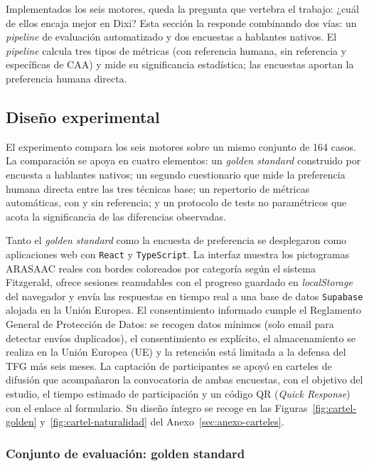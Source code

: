 Implementados los seis motores, queda la pregunta que vertebra el trabajo: ¿cuál de ellos encaja mejor en Dixi? Esta sección la responde combinando dos vías: un \textit{pipeline} de evaluación automatizado y dos encuestas a hablantes nativos. El \textit{pipeline} calcula tres tipos de métricas (con referencia humana, sin referencia y específicas de CAA) y mide su significancia estadística; las encuestas aportan la preferencia humana directa.

\subsection{Diseño experimental}
\label{sec:eval-diseno}

El experimento compara los seis motores sobre un mismo conjunto de 164 casos. La comparación se apoya en cuatro elementos: un \textit{golden standard} construido por encuesta a hablantes nativos; un segundo cuestionario que mide la preferencia humana directa entre las tres técnicas base; un repertorio de métricas automáticas, con y sin referencia; y un protocolo de tests no paramétricos que acota la significancia de las diferencias observadas.

Tanto el \textit{golden standard} como la encuesta de preferencia se desplegaron como aplicaciones web con \texttt{React} y \texttt{TypeScript}. La interfaz muestra los pictogramas ARASAAC reales con bordes coloreados por categoría según el sistema Fitzgerald, ofrece sesiones reanudables con el progreso guardado en \textit{localStorage} del navegador y envía las respuestas en tiempo real a una base de datos \texttt{Supabase} alojada en la Unión Europea. El consentimiento informado cumple el Reglamento General de Protección de Datos: se recogen datos mínimos (solo email para detectar envíos duplicados), el consentimiento es explícito, el almacenamiento se realiza en la Unión Europea (UE) y la retención está limitada a la defensa del TFG más seis meses. La captación de participantes se apoyó en carteles de difusión que acompañaron la convocatoria de ambas encuestas, con el objetivo del estudio, el tiempo estimado de participación y un código QR (\textit{Quick Response}) con el enlace al formulario. Su diseño íntegro se recoge en las Figuras~\ref{fig:cartel-golden} y~\ref{fig:cartel-naturalidad} del Anexo~\ref{sec:anexo-carteles}.

\subsubsection{Conjunto de evaluación: golden standard}
\label{sec:eval-golden}

